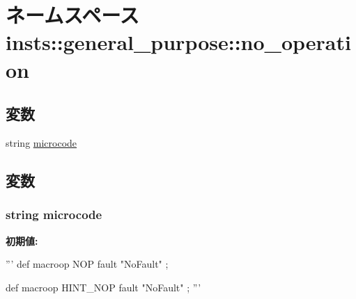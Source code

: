 \hypertarget{namespaceinsts_1_1general__purpose_1_1no__operation}{
\section{ネームスペース insts::general\_\-purpose::no\_\-operation}
\label{namespaceinsts_1_1general__purpose_1_1no__operation}
}
\subsection*{変数}
\begin{DoxyCompactItemize}
\item 
string \hyperlink{namespaceinsts_1_1general__purpose_1_1no__operation_a770f11a173e99389a8802f0107ed8f52}{microcode}
\end{DoxyCompactItemize}


\subsection{変数}
\hypertarget{namespaceinsts_1_1general__purpose_1_1no__operation_a770f11a173e99389a8802f0107ed8f52}{
\subsubsection[{microcode}]{\setlength{\rightskip}{0pt plus 5cm}string {\bf microcode}}}
\label{namespaceinsts_1_1general__purpose_1_1no__operation_a770f11a173e99389a8802f0107ed8f52}
{\bfseries 初期値:}
\begin{DoxyCode}
'''
def macroop NOP
{
    fault "NoFault"
};

def macroop HINT_NOP
{
    fault "NoFault"
};
'''
\end{DoxyCode}
